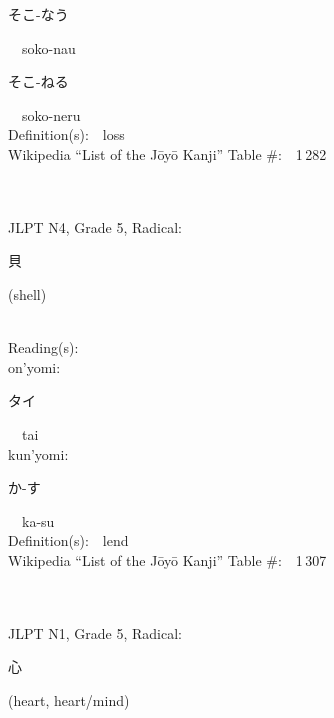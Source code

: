\begin{multicols}{2}
{\hspace*{2em}}{\begin{CJK}{UTF8}{min} そこ-なう \end{CJK}}\ \ soko-nau\ \ \\
{\hspace*{2em}}{\begin{CJK}{UTF8}{min} そこ-ねる \end{CJK}}\ \ soko-neru\ \ \\
Definition(s):\ \ loss \\
Wikipedia ``List of the J\=oy\=o Kanji'' Table \#:\ \ 1\,282 \\
\ \ \\
{\fontsize{34pt}{40pt}  }\ \ \\  %
{JLPT N4, Grade 5, Radical:\ \ {\begin{CJK}{UTF8}{min} 貝 \end{CJK}} (shell) } \\
Reading(s):\ \ \\
{\hspace*{1em}}on'yomi:\ \ \\
{\hspace*{2em}}{\begin{CJK}{UTF8}{min} タイ \end{CJK}}\ \ tai\ \ \\
{\hspace*{1em}}kun'yomi:\ \ \\
{\hspace*{2em}}{\begin{CJK}{UTF8}{min} か-す \end{CJK}}\ \ ka-su\ \ \\
Definition(s):\ \ lend \\
Wikipedia ``List of the J\=oy\=o Kanji'' Table \#:\ \ 1\,307 \\
\ \ \\
{\fontsize{34pt}{40pt}  }\ \ \\  %
{JLPT N1, Grade 5, Radical:\ \ {\begin{CJK}{UTF8}{min} 心 \end{CJK}} (heart, heart/mind) } \\

\end{multicols}
